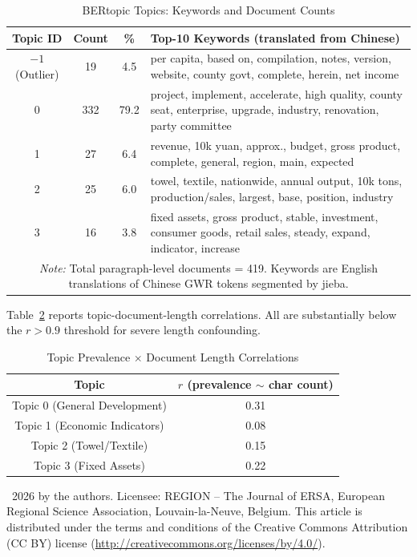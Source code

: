 \documentclass[a4paper, twoside, final]{article}
\begin{document}
\begin{table}[htbp]
\centering
\caption{BERtopic Topics: Keywords and Document Counts}
\label{tab:A1}
\footnotesize
\setlength{\tabcolsep}{3.5pt}
\begin{tabular}{c c c p{6.2cm}}
\toprule
Topic ID & Count & \% & Top-10 Keywords (translated from Chinese) \\
\midrule
$-1$ (Outlier) & 19 & 4.5 & per capita, based on, compilation, notes, version, website, county govt, complete, herein, net income \\
0 & 332 & 79.2 & project, implement, accelerate, high quality, county seat, enterprise, upgrade, industry, renovation, party committee \\
1 & 27 & 6.4 & revenue, 10k yuan, approx., budget, gross product, complete, general, region, main, expected \\
2 & 25 & 6.0 & towel, textile, nationwide, annual output, 10k tons, production/sales, largest, base, position, industry \\
3 & 16 & 3.8 & fixed assets, gross product, stable, investment, consumer goods, retail sales, steady, expand, indicator, increase \\
\bottomrule
\multicolumn{4}{p{11cm}}{\footnotesize\textit{Note:} Total paragraph-level documents = 419. Keywords are English translations of Chinese GWR tokens segmented by jieba.} \\
\end{tabular}
\end{table}

Table~\ref{tab:A2} reports topic-document-length correlations. All are substantially below the $r>0.9$ threshold for severe length confounding.

\begin{table}[htbp]
\centering
\caption{Topic Prevalence $\times$ Document Length Correlations}
\label{tab:A2}
\begin{tabular}{c c}
\toprule
Topic & $r$ (prevalence $\sim$ char count) \\
\midrule
Topic 0 (General Development) & 0.31 \\
Topic 1 (Economic Indicators) & 0.08 \\
Topic 2 (Towel/Textile) & 0.15 \\
Topic 3 (Fixed Assets) & 0.22 \\
\bottomrule
\end{tabular}
\end{table}

\vspace*{\fill}
\noindent
{\footnotesize \textcopyright\ 2026 by the authors. Licensee: REGION -- The Journal of ERSA, European Regional Science Association, Louvain-la-Neuve, Belgium. This article is distributed under the terms and conditions of the Creative Commons Attribution (CC BY) license (\href{http://creativecommons.org/licenses/by/4.0/}{http://creativecommons.org/licenses/by/4.0/}).}
\end{document}
